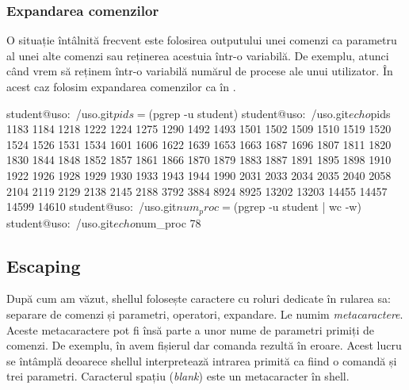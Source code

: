\subsubsection{Expandarea comenzilor}
\label{sec:cli:shell-func:expansion:commands}

O situație întâlnită frecvent este folosirea outputului unei comenzi ca
parametru al unei alte comenzi sau reținerea acestuia într-o variabilă. De exemplu,
atunci când vrem să reținem într-o variabilă numărul de procese ale unui utilizator. În acest caz folosim expandarea comenzilor ca în .

\begin{screen}[caption={Expandarea comenzilor},label={lst:cli:comm-expansion}]
student@uso:~/uso.git$ pids=$(pgrep -u student)
student@uso:~/uso.git$ echo $pids
1183 1184 1218 1222 1224 1275 1290 1492 1493 1501 1502 1509 1510 1519 1520 1524 1526 1531 1534 1601 1606 1622 1639 1653 1663 1687 1696 1807 1811 1820 1830 1844 1848 1852 1857 1861 1866 1870 1879 1883 1887 1891 1895 1898 1910 1922 1926 1928 1929 1930 1933 1943 1944 1990 2031 2033 2034 2035 2040 2058 2104 2119 2129 2138 2145 2188 3792 3884 8924 8925 13202 13203 14455 14457 14599 14610
student@uso:~/uso.git$ num_proc=$(pgrep -u student | wc -w)
student@uso:~/uso.git$ echo $num_proc
78
\end{screen}

\subsection{Escaping}
\label{sec:cli:shell-func:escaping}

După cum am văzut, shellul folosește caractere cu roluri dedicate în rularea sa:
separare de comenzi și parametri, operatori, expandare. Le numim \textit{metacaractere}. Aceste metacaractere pot
fi însă parte a unor nume de parametri primiți de comenzi. De exemplu, în  avem
fișierul  dar comanda rezultă în eroare. Acest lucru se întâmplă deoarece shellul interpretează intrarea primită ca fiind o comandă și trei parametri. Caracterul spațiu (\textit{blank}) este un metacaracter în shell.


